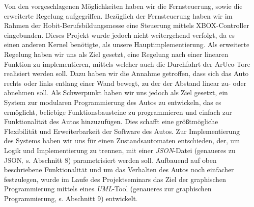 Von den vorgeschlagenen Möglichkeiten haben wir die Fernsteuerung, sowie die erweiterte Regelung aufgegriffen. Bezüglich der Fernsteuerung haben wir im Rahmen der Hobit-Berufsbildungsmesse eine Steuerung mittels XBOX-Controller eingebunden. Dieses Projekt wurde jedoch nicht weitergehend verfolgt, da es einen anderen Kernel benötigte, als unsere Hauptimplementierung. 
Als erweiterte Regelung haben wir uns als Ziel gesetzt, eine Regelung nach einer linearen Funktion zu implementieren, mittels welcher auch die Durchfahrt der ArUco-Tore realisiert werden soll. Dazu haben wir die Annahme getroffen, dass sich das Auto rechts oder links entlang einer Wand bewegt, zu der der Abstand linear zu- oder abnehmen soll. 
\newline
Als Schwerpunkt haben wir uns jedoch als Ziel gesetzt, ein System zur modularen Programmierung des Autos zu entwickeln, das es ermöglicht, beliebige Funktionsbausteine zu programmieren und einfach zur Funktionalität des Autos hinzuzufügen. Dies schafft eine größtmögliche Flexibilität und Erweiterbarkeit der Software des Autos. 
Zur Implementierung des Systems haben wir uns für einen Zustandsautomaten entschieden, der, um Logik und Implementierung zu trennen, mit einer \textit{JSON}-Datei (genaueres zu JSON, s. Abschnitt 8) parametrisiert werden soll. 
Aufbauend auf oben beschriebene Funktionalität und um das Verhalten des Autos noch einfacher festzulegen, wurde im Laufe des Projektseminars das Ziel der graphischen Programmierung mittels eines \textit{UML}-Tool (genaueres zur graphischen Programmierung, s. Abschnitt 9) entwickelt.
